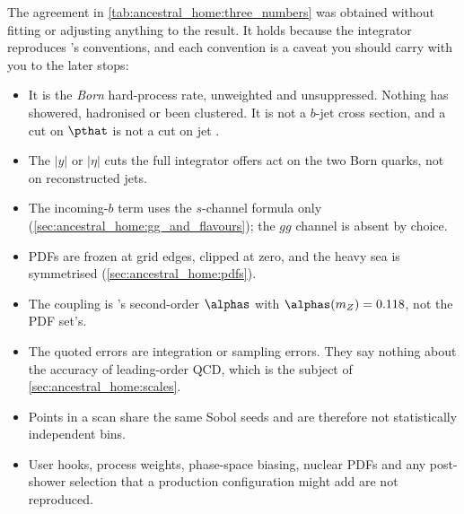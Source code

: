 The agreement in \cref{tab:ancestral_home:three_numbers} was obtained without
fitting or adjusting anything to the \PYTHIA result. It holds because the
integrator reproduces \PYTHIA's conventions, and each convention is a caveat
you should carry with you to the later stops:
\begin{itemize}
  \item It is the \emph{Born} hard-process rate, unweighted and unsuppressed.
    Nothing has showered, hadronised or been clustered. It is not a $b$-jet
    cross section, and a cut on $\pthat$ is not a cut on jet \pt.
  \item The $|y|$ or $|\eta|$ cuts the full integrator offers act on the two
    Born quarks, not on reconstructed jets.
  \item The incoming-$b$ term uses the $s$-channel formula only
    (\cref{sec:ancestral_home:gg_and_flavours}); the $gg$ channel is absent by
    choice.
  \item PDFs are frozen at grid edges, clipped at zero, and the heavy sea is
    symmetrised (\cref{sec:ancestral_home:pdfs}).
  \item The coupling is \PYTHIA's second-order $\alphas$ with
    $\alphas(m_Z)=0.118$, not the PDF set's.
  \item The quoted errors are integration or sampling errors. They say nothing
    about the accuracy of leading-order QCD, which is the subject of
    \cref{sec:ancestral_home:scales}.
  \item Points in a \pt scan share the same Sobol seeds and are therefore not
    statistically independent bins.
  \item User hooks, process weights, phase-space biasing, nuclear PDFs and
    any post-shower selection that a production configuration might add are
    not reproduced.
\end{itemize}

